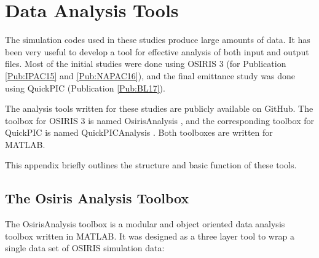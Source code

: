 %
%

\chapter{Data Analysis Tools}
\label{Apx:DA}

The simulation codes used in these studies produce large amounts of data.
It has been very useful to develop a tool for effective analysis of both input and output files.
Most of the initial studies were done using OSIRIS 3 (for Publication \ref{Pub:IPAC15} and \ref{Pub:NAPAC16}), and the final emittance study was done using QuickPIC (Publication \ref{Pub:BL17}).

The analysis tools written for these studies are publicly available on GitHub.
The toolbox for OSIRIS 3 is named OsirisAnalysis \cite{code:osiris_analysis:2013}, and the corresponding toolbox for QuickPIC is named QuickPICAnalysis \cite{code:quickpic_analysis:2017}.
Both toolboxes are written for MATLAB.

This appendix briefly outlines the structure and basic function of these tools.


\section{The Osiris Analysis Toolbox}
\label{Tools:OA}

The OsirisAnalysis toolbox is a modular and object oriented data analysis toolbox written in MATLAB.
It was designed as a three layer tool to wrap a single data set of OSIRIS simulation data:

